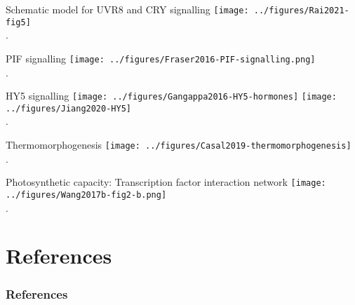 \documentclass[10pt]{beamer}
\begin{document}
\begin{frame}{Schematic model for UVR8 and CRY signalling}
    \centering
    \texttt{[image: ../figures/Rai2021-fig5]}\\
    {\footnotesize \autocite[Fig.\ 5 in][]{Rai2021}.}
\end{frame}

\begin{frame}{PIF signalling}
    \centering
    \texttt{[image: ../figures/Fraser2016-PIF-signalling.png]}\\
    {\footnotesize \autocite[Fig.\ 6 in][]{Fraser2016}.}
\end{frame}

\begin{frame}{HY5 signalling}
    \centering
    \texttt{[image: ../figures/Gangappa2016-HY5-hormones]}%
    \texttt{[image: ../figures/Jiang2020-HY5]}\\
    {\footnotesize \autocite[Fig.\ 6 in][]{Jiang2020a,Gangappa2016}.}
\end{frame}

\begin{frame}{Thermomorphogenesis}
    \centering
    \texttt{[image: ../figures/Casal2019-thermomorphogenesis]}\\
    {\footnotesize \autocite[Fig.\ 6 in][]{Casal2019}.}
\end{frame}

\begin{frame}{Photosynthetic capacity: Transcription factor interaction network}
    \centering
    \texttt{[image: ../figures/Wang2017b-fig2-b.png]}\\
    {\footnotesize \autocite[Fig.\ 2 in][]{Wang2017b}.}
\end{frame}


  \section*{References}
  \begin{frame}[t,allowframebreaks]
    \frametitle{References}
    \printbibliography
  \end{frame}
\end{document}
